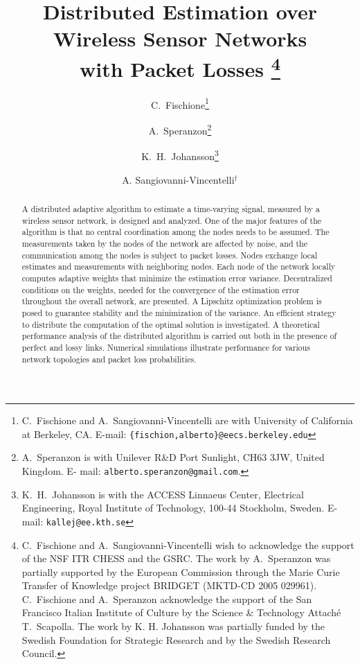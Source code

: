 \documentclass[a4paper,notitlepage,onecolumn]{article}
\numberwithin{equation}{section}
\begin{document}
\title{Distributed Estimation over Wireless Sensor Networks\\ with Packet Losses
\thanks{C.~Fischione and A.~Sangiovanni-Vincentelli wish to acknowledge the
support of the NSF ITR CHESS and the GSRC. The work by A.~Speranzon
was partially supported by the European Commission through the Marie
Curie Transfer of Knowledge project BRIDGET (MKTD-CD 2005 029961).
C.~Fischione and A.~Speranzon acknowledge the support of the San
Francisco Italian Institute of Culture by the Science \&
Technology Attach\'e T.~Scapolla. The work by K. H. Johansson was partially funded by the Swedish Foundation for Strategic Research and by the Swedish Research Council.}}
\author{C.~Fischione\thanks{C.~Fischione and A.~Sangiovanni-Vincentelli are with University of California at Berkeley, CA. E-mail:
\texttt{\{fischion,alberto\}@eecs.berkeley.edu}} \and A.~Speranzon\thanks{A.~Speranzon is
with Unilever R\&D Port Sunlight, CH63 3JW, United Kingdom. E- mail:
\texttt{alberto.speranzon@gmail.com}.} \and K.~H.~Johansson\thanks{K.~H.~Johansson is with the
ACCESS Linnaeus Center, Electrical Engineering, Royal Institute of Technology, 100-44 Stockholm, Sweden. E-mail: \texttt{kallej@ee.kth.se}}\and A. Sangiovanni-Vincentelli$^\dag$}

\maketitle
\begin{abstract}
A distributed adaptive algorithm to estimate a time-varying
signal, measured by a wireless sensor network, is designed and
analyzed. One of the major features of the algorithm is that no
central coordination among the nodes needs to be assumed. The
measurements taken by the nodes of the network are affected by
noise, and the communication among the nodes is subject to packet
losses. Nodes exchange local estimates and measurements with
neighboring nodes. Each node of the network locally computes
adaptive weights that minimize the estimation error variance.
Decentralized conditions on the weights, needed for the
convergence of the estimation error throughout the overall
network, are presented. A Lipschitz optimization problem is posed
to guarantee stability and the minimization of the variance. An
efficient strategy to distribute the computation of the optimal
solution is investigated. A theoretical performance analysis of
the distributed algorithm is carried out both in the presence of
perfect and lossy links. Numerical simulations illustrate
performance for various network topologies and packet loss
probabilities.
\end{abstract}
\end{document}
